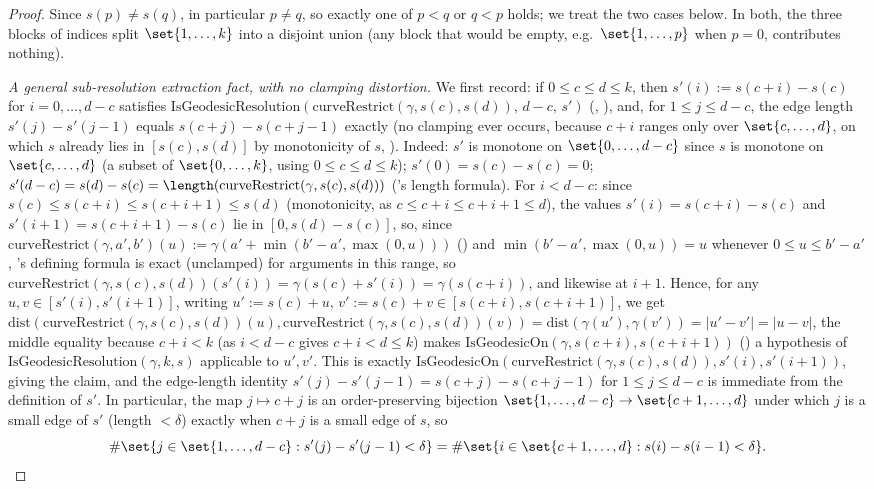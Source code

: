 \begin{proof}
  Since $s(p) \ne s(q)$, in particular $p \ne q$, so exactly one of $p<q$ or $q<p$ holds; we treat
  the two cases below. In both, the three blocks of indices split $\set{1,\dots,k}$ into a disjoint
  union (any block that would be empty, e.g.\ $\set{1,\dots,p}$ when $p=0$, contributes nothing).

  \emph{A general sub-resolution extraction fact, with no clamping distortion.} We first record: if
  $0 \le c \le d \le k$, then $s'(i) := s(c+i)-s(c)$ for $i=0,\dots,d-c$ satisfies
  $\mathrm{IsGeodesicResolution}(\mathrm{curveRestrict}(\gamma,s(c),s(d)),\, d-c,\, s')$
  (, ), and, for $1 \le j \le d-c$, the edge
  length $s'(j)-s'(j-1)$ equals $s(c+j)-s(c+j-1)$ exactly (no clamping ever occurs, because $c+i$
  ranges only over $\set{c,\dots,d}$, on which $s$ already lies in $[s(c),s(d)]$ by monotonicity of
  $s$, ). Indeed: $s'$ is monotone on $\set{0,\dots,d-c}$ since $s$ is
  monotone on $\set{c,\dots,d}$ (a subset of $\set{0,\dots,k}$, using $0\le c\le d\le k$); $s'(0) =
  s(c)-s(c)=0$; $s'(d-c)=s(d)-s(c) = \length(\mathrm{curveRestrict}(\gamma,s(c),s(d)))$
  ('s length formula). For $i < d-c$: since $s(c) \le s(c+i) \le s(c+i+1)
  \le s(d)$ (monotonicity, as $c \le c+i \le c+i+1 \le d$), the values $s'(i)=s(c+i)-s(c)$ and
  $s'(i+1)=s(c+i+1)-s(c)$ lie in $[0,s(d)-s(c)]$, so, since $\mathrm{curveRestrict}(\gamma,a',b')(u) := \gamma(a' + \min(b'-a',\max(0,u)))$
  () and $\min(b'-a',\max(0,u))=u$ whenever $0\le u\le b'-a'$,
  's defining formula is exact (unclamped) for arguments in this range, so
  $\mathrm{curveRestrict}(\gamma,s(c),s(d))(s'(i)) =
  \gamma(s(c)+s'(i)) = \gamma(s(c+i))$, and likewise at $i+1$. Hence, for any $u,v \in
  [s'(i),s'(i+1)]$, writing $u' := s(c)+u,\, v':=s(c)+v \in [s(c+i),s(c+i+1)]$, we get
  $\mathrm{dist}(\mathrm{curveRestrict}(\gamma,s(c),s(d))(u),
  \mathrm{curveRestrict}(\gamma,s(c),s(d))(v)) = \mathrm{dist}(\gamma(u'),\gamma(v')) = |u'-v'| =
  |u-v|$, the middle equality because $c+i < k$ (as $i<d-c$ gives $c+i<d\le k$) makes
  $\mathrm{IsGeodesicOn}(\gamma,s(c+i),s(c+i+1))$ () a hypothesis of
  $\mathrm{IsGeodesicResolution}(\gamma,k,s)$ applicable to $u',v'$. This is exactly
  $\mathrm{IsGeodesicOn}(\mathrm{curveRestrict}(\gamma,s(c),s(d)),s'(i),s'(i+1))$, giving the claim,
  and the edge-length identity $s'(j)-s'(j-1) = s(c+j)-s(c+j-1)$ for $1\le j\le d-c$ is immediate
  from the definition of $s'$. In particular, the map $j \mapsto c+j$ is an order-preserving
  bijection $\set{1,\dots,d-c} \to \set{c+1,\dots,d}$ under which $j$ is a small edge of $s'$
  (length $<\delta$) exactly when $c+j$ is a small edge of $s$, so
  \begin{equation}
    \label{eq:count-subres}
    \#\set{j \in \set{1,\dots,d-c} : s'(j)-s'(j-1)<\delta}
    = \#\set{i \in \set{c+1,\dots,d} : s(i)-s(i-1)<\delta}
    .
  \end{equation}


\end{proof}
